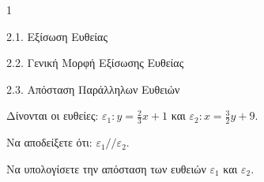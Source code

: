 \begin{ylh}{1}
    \item 2.1. Εξίσωση Ευθείας
    \item 2.2. Γενική Μορφή Εξίσωσης Ευθείας
    \item 2.3. Απόσταση Παράλληλων Ευθειών
\end{ylh}
Δίνονται οι ευθείες: $\varepsilon_1: y = \frac{2}{3}x + 1$ και $\varepsilon_2: x = \frac{3}{2}y + 9$.
\begin{alist}
\item Να αποδείξετε ότι: $\varepsilon_1 // \varepsilon_2$.  
\item Να υπολογίσετε την απόσταση των ευθειών $\varepsilon_1$ και $\varepsilon_2$.  
\end{alist}